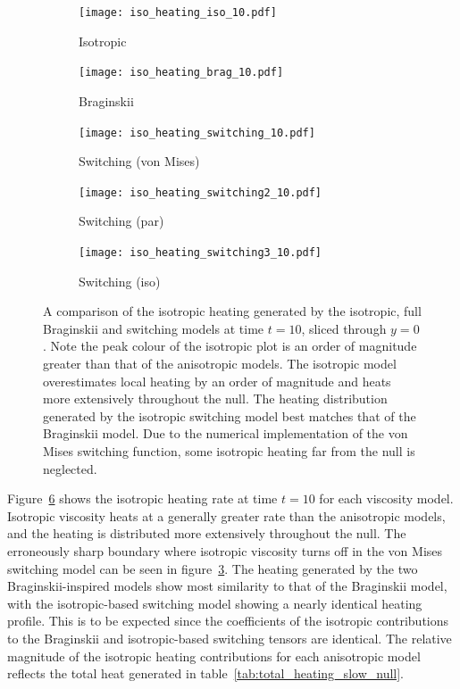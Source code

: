 \begin{figure}[t]
    \centering
    \hfill
    \begin{subfigure}{0.32\textwidth}
      \texttt{[image: iso\_heating\_iso\_10.pdf]}
      \caption{Isotropic}%
      \label{fig:iso_heating_iso_10}
    \end{subfigure}
    \hfill
    \begin{subfigure}{0.32\textwidth}
      \texttt{[image: iso\_heating\_brag\_10.pdf]}
      \caption{Braginskii}%
      \label{fig:iso_heating_brag_10}
    \end{subfigure}
    \hfill
    \begin{subfigure}{0.32\textwidth}
      \texttt{[image: iso\_heating\_switching\_10.pdf]}
      \caption{Switching (von Mises)}%
      \label{fig:iso_heating_switching_10}
    \end{subfigure}
    \begin{subfigure}{0.32\textwidth}
      \texttt{[image: iso\_heating\_switching2\_10.pdf]}
      \caption{Switching (par)}%
      \label{fig:iso_heating_switching2_10}
    \end{subfigure}
    \begin{subfigure}{0.32\textwidth}
      \texttt{[image: iso\_heating\_switching3\_10.pdf]}
      \caption{Switching (iso)}%
      \label{fig:iso_heating_switching3_10}
    \end{subfigure}

    \caption{A comparison of the isotropic heating generated by the isotropic, full Braginskii and switching models at time $t=10$, sliced through $y=0$. Note the peak colour of the isotropic plot is an order of magnitude greater than that of the anisotropic models. The isotropic model overestimates local heating by an order of magnitude and heats more extensively throughout the null. The heating distribution generated by the isotropic switching model best matches that of the Braginskii model. Due to the numerical implementation of the von Mises switching function, some isotropic heating far from the null is neglected.}
\label{fig:isotropic_heating}%
\end{figure}

Figure~\ref{fig:isotropic_heating} shows the isotropic heating rate at time $t=10$ for each viscosity model. Isotropic viscosity heats at a generally greater rate than the anisotropic models, and the heating is distributed more extensively throughout the null. The erroneously sharp boundary where isotropic viscosity turns off in the von Mises switching model can be seen in figure~\ref{fig:iso_heating_switching_10}. The heating generated by the two Braginskii-inspired models show most similarity to that of the Braginskii model, with the isotropic-based switching model showing a nearly identical heating profile. This is to be expected since the coefficients of the isotropic contributions to the Braginskii and isotropic-based switching tensors are identical. The relative magnitude of the isotropic heating contributions for each anisotropic model reflects the total heat generated in table~\ref{tab:total_heating_slow_null}.

